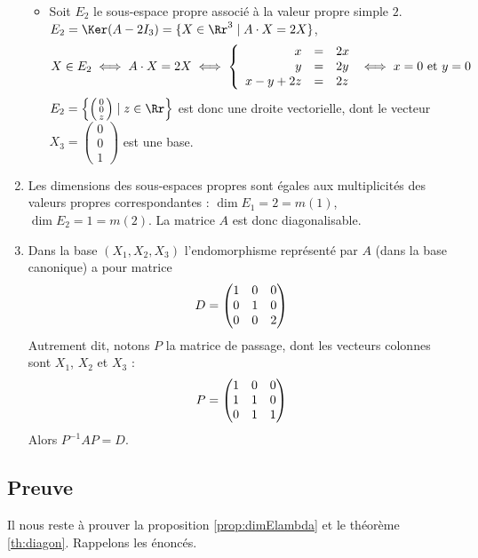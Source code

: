\documentclass[12pt, class=report,crop=false]{standalone}
\begin{document}
\begin{exemple}
\begin{enumerate}
\begin{itemize}
    
    \item Soit $E_2$ le sous-espace propre associé à la valeur propre simple $2$.
$E_2 = \Ker(A-2I_3) = \{ X \in\Rr^3 \mid  A\cdot X=2X\}$, 
$$X\in E_2\iff A\cdot X=2X \iff \left\{\begin{array}{rcl}
x&=&2x\cr 
y&=&2y\cr 
x-y+2z&=&2z
\end{array}\right.\iff x=0 \text{ et } y=0$$
$E_2 = \left\lbrace\left(\begin{smallmatrix}0\\0\\z\end{smallmatrix}\right) \mid z \in \Rr\right\rbrace$ est donc une droite vectorielle, dont le vecteur $X_3=\left(\begin{smallmatrix}0\\0\\1\end{smallmatrix}\right)$ est une base.

    
  \end{itemize}
  
  
  \item Les dimensions des sous-espaces propres sont égales aux  multiplicités des valeurs propres correspondantes :
  $\dim E_1 = 2 = m(1)$, $\dim E_2 = 1 = m(2)$. La matrice $A$ est donc diagonalisable.
  
  
  \item Dans la base $(X_1, X_2, X_3)$ l'endomorphisme représenté par $A$ (dans la base canonique) a pour matrice
$$D=\left(\begin{matrix}1&0&0\cr 0&1&0\cr 0&0&2\end{matrix}\right)$$
Autrement dit, notons $P$ la matrice de passage, dont les vecteurs colonnes sont $X_1$, $X_2$ et $X_3$ :
$$P=\begin{pmatrix}1&0&0\cr 1&1&0\cr 0&1&1\end{pmatrix}$$
Alors $P^{-1}AP=D$.
\end{enumerate}

\end{exemple}



\subsection{Preuve}

Il nous reste à prouver la proposition \ref{prop:dimElambda} et le théorème \ref{th:diagon}.
Rappelons les énoncés.
\end{document}
